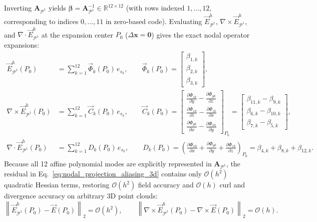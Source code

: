 \documentclass[preprint,12pt]{elsarticle}
\newcommand{\curl}{\nabla \times}
\newcommand{\divg}{\nabla \cdot}
\newcommand{\R}{\mathbb{R}}
\begin{document}
Inverting $\mathbf{A}_{\mathcal{P}^1}$ yields $\bm{\beta} = \mathbf{A}_{\mathcal{P}^1}^{-1} \in \R^{12\times 12}$ (with rows indexed $1,\dots,12$, corresponding to indices $0,\dots,11$ in zero-based code). Evaluating $\vec{E}^h_{\mathcal{P}^1}$, $\curl\vec{E}^h_{\mathcal{P}^1}$, and $\divg\vec{E}^h_{\mathcal{P}^1}$ at the expansion center $P_0$ ($\Delta\mathbf{x} = \mathbf{0}$) gives the exact nodal operator expansions:
\begin{align}
    \vec{E}^h_{\mathcal{P}^1}(P_0) &= \sum_{k=1}^{12} \vec{\Phi}_k(P_0)\,e_{s_k}, \qquad \vec{\Phi}_k(P_0) = \begin{bmatrix} \beta_{1,k} \\ \beta_{2,k} \\ \beta_{3,k} \end{bmatrix}, \label{eq:phi_p1_3d} \\
    \curl\vec{E}^h_{\mathcal{P}^1}(P_0) &= \sum_{k=1}^{12} \vec{C}_k(P_0)\,e_{s_k}, \qquad \vec{C}_k(P_0) = \begin{bmatrix} \frac{\partial\Phi_{zk}}{\partial y} - \frac{\partial\Phi_{yk}}{\partial z} \\[3pt] \frac{\partial\Phi_{xk}}{\partial z} - \frac{\partial\Phi_{zk}}{\partial x} \\[3pt] \frac{\partial\Phi_{yk}}{\partial x} - \frac{\partial\Phi_{xk}}{\partial y} \end{bmatrix}_{P_0} = \begin{bmatrix} \beta_{11,k} - \beta_{9,k} \\ \beta_{6,k} - \beta_{10,k} \\ \beta_{7,k} - \beta_{5,k} \end{bmatrix}, \label{eq:curl_p1_3d} \\
    \divg\vec{E}^h_{\mathcal{P}^1}(P_0) &= \sum_{k=1}^{12} D_k(P_0)\,e_{s_k}, \qquad D_k(P_0) = \left(\frac{\partial\Phi_{xk}}{\partial x} + \frac{\partial\Phi_{yk}}{\partial y} + \frac{\partial\Phi_{zk}}{\partial z}\right)_{P_0} = \beta_{4,k} + \beta_{8,k} + \beta_{12,k}. \label{eq:div_p1_3d}
\end{align}
Because all 12 affine polynomial modes are explicitly represented in $\mathbf{A}_{\mathcal{P}^1}$, the residual in Eq.~\eqref{eq:nodal_projection_aliasing_3d} contains only $\mathcal{O}(h^2)$ quadratic Hessian terms, restoring $\mathcal{O}(h^2)$ field accuracy and $\mathcal{O}(h)$ curl and divergence accuracy on arbitrary 3D point clouds:
\begin{equation}
    \left\|\vec{E}^h_{\mathcal{P}^1}(P_0) - \vec{E}(P_0)\right\|_2 = \mathcal{O}(h^2), \qquad \left\|\curl\vec{E}^h_{\mathcal{P}^1}(P_0) - \curl\vec{E}(P_0)\right\|_2 = \mathcal{O}(h).
    \label{eq:p1_error_bounds_3d}
\end{equation}
\end{document}
